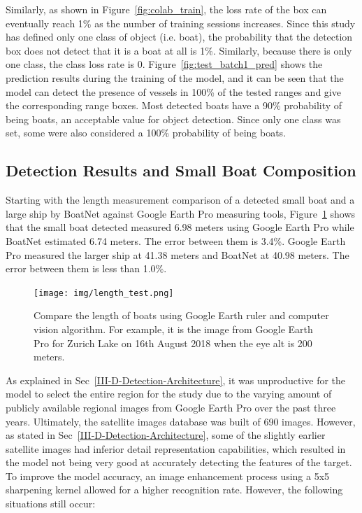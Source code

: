 Similarly, as shown in Figure~\ref{fig:colab_train}, the loss rate of the box can eventually reach 1\% as the number of training sessions increases. Since this study has defined only one class of object (i.e. boat), the probability that the detection box does not detect that it is a boat at all is 1\%. Similarly, because there is only one class, the class loss rate is 0. Figure~\ref{fig:test_batch1_pred} shows the prediction results during the training of the model, and it can be seen that the model can detect the presence of vessels in 100\% of the tested ranges and give the corresponding range boxes. Most detected boats have a 90\% probability of being boats, an acceptable value for object detection. Since only one class was set, some were also considered a 100\% probability of being boats.

\subsection{Detection Results and Small Boat Composition}
Starting with the length measurement comparison of a detected small boat and a large ship by BoatNet against Google Earth Pro measuring tools, Figure~\ref{fig:length_test} shows that the small boat detected measured 6.98 meters using Google Earth Pro while BoatNet estimated 6.74 meters. The error between them is 3.4\%. Google Earth Pro measured the larger ship at 41.38 meters and BoatNet at 40.98 meters. The error between them is less than 1.0\%.

\begin{figure}[t]
    \center
    \texttt{[image: img/length\_test.png]}
    \caption{Compare the length of boats using Google Earth ruler and computer vision algorithm. For example, it is the image from Google Earth Pro for Zurich Lake on 16th August 2018 when the eye alt is 200 meters.}
    \label{fig:length_test}
\end{figure}

As explained in Sec~\ref{III-D-Detection-Architecture}, it was unproductive for the model to select the entire region for the study due to the varying amount of publicly available regional images from Google Earth Pro over the past three years. Ultimately, the satellite images database was built of 690 images. However, as stated in Sec~\ref{III-D-Detection-Architecture}, some of the slightly earlier satellite images had inferior detail representation capabilities, which resulted in the model not being very good at accurately detecting the features of the target. To improve the model accuracy, an image enhancement process using a 5x5 sharpening kernel allowed for a higher recognition rate. However, the following situations still occur:

